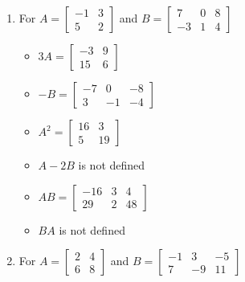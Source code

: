 \documentclass{ximera}
\begin{document}
\begin{enumerate}
\begin{multicols}{3}
\begin{itemize}
\end{itemize}
\end{multicols}

\item For  $A = \left[ \begin{array}{rr} -1 & 3 \\ 5 & 2 \end{array} \right]$ and
 $B=\left[ \begin{array}{rrr} 7 & 0 & 8 \\ -3 & 1 & 4 \end{array} \right]$
 
\begin{multicols}{3}
\begin{itemize}
\item  $3A = \left[ \begin{array}{rr} -3 & 9 \\ 15 & 6\end{array} \right]$

\item $-B = \left[ \begin{array}{rrr} -7 & 0 & -8 \\ 3 & -1 & -4 \end{array} \right]$

\item $A^2 = \left[ \begin{array}{rr} 16 & 3 \\ 5 & 19 \end{array} \right]$

\end{itemize}
\end{multicols}


\begin{multicols}{3}
\begin{itemize}
\item  $A-2B$ is not defined

\item $AB = \left[ \begin{array}{rrr} -16 & 3 & 4 \\ 29 & 2 & 48 \end{array} \right]$

\item $BA$ is not defined

\end{itemize}
\end{multicols}

\item For  $A = \left[ \begin{array}{rr} 2 & 4 \\ 6 & 8 \end{array} \right]$ and $B=\left[ \begin{array}{rrr} -1 & 3 & -5 \\ 7 & -9 & 11 \end{array} \right]$


\end{enumerate}
\end{document}
